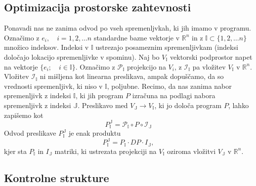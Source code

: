 \documentclass{article}
\newcommand{\RR}{\mathbb{R}}
\newcommand{\II}{\mathbb{I}}
\newcommand{\JJ}{\mathbb{J}}
\begin{document}
\subsection{Optimizacija prostorske zahtevnosti}
Ponavadi nas ne zanima odvod po vseh spremenljvkah, ki jih imamo v programu.
Označimo z $e_i,\quad i=1,2,\ldots n$ standardne bazne vektorje v $\RR^n$ in z
$\II\subset\{1,2,\ldots n\}$ množico indeksov. Indeksi v $\II$ ustrezajo
posameznim spremenljivkam (indeksi določajo lokacijo spremenljivke v spominu). Naj bo $V_\II$ vektorski
podprostor napet na vektorje $\{e_i;\quad i\in\II\}$. Označimo z 
$\mathcal{P}_\II$ projekcijo na $V_i$, z $\mathcal{I}_\II$ pa vložitev $V_\II$ v
$\RR^n$. Vložitev $\mathcal{I}_\II$ ni mišljena kot linearna preslikava, ampak
dopuščamo, da so vrednosti spremenljivk, ki niso v $\II$, poljubne. Recimo, da nas zanima nabor spremenljivk z indeksi $\II$, ki jih
program $P$ izračuna na podlagi nabora spremenljivk z indeksi $\mathbb{J}$.
Preslikavo med $V_\JJ\to V_\II$, ki jo določa program $P$, lahko zapišemo kot
\begin{equation}
  \label{eq:zozitev}
  P^{\JJ}_{\II}=\mathcal{P}_\II\circ P\circ \mathcal{I}_\JJ 
\end{equation}
Odvod preslikave $ P^{\JJ}_{\II}$ je enak produktu
\begin{equation*}
  P^{\JJ}_{\II}=P_\II\cdot DP\cdot I_\JJ,   
\end{equation*}
kjer sta $P_\II$ in  $I_\JJ$ matriki, ki ustrezata projekciji na $V_\II$ oziroma
vložitvi $V_\JJ$ v $\RR^n$.

\subsection{Kontrolne strukture}
\end{document}
